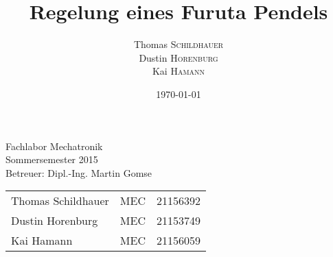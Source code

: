 \title{Regelung eines Furuta Pendels} %

\author{
Thomas \textsc{Schildhauer} \\
Dustin \textsc{Horenburg} \\
Kai \textsc{Hamann} } %


\date{\today} %



\maketitle %

\vspace{2cm}

\begin{center}
Fachlabor Mechatronik \\
Sommersemester 2015 \\ 
Betreuer: Dipl.-Ing. Martin Gomse

\vspace{2cm}

\begin{tabular}{l c r}
Thomas Schildhauer	& MEC & 21156392 \\
Dustin Horenburg	& MEC & 21153749 \\
Kai Hamann			& MEC & 21156059

\end{tabular}
\end{center}


